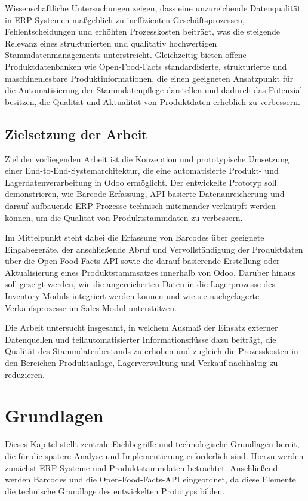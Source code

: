 \documentclass[12pt,a4paper]{article}
\begin{document}
Wissenschaftliche Untersuchungen zeigen, dass eine unzureichende Datenqualität in ERP-Systemen maßgeblich zu ineffizienten Geschäftsprozessen, Fehlentscheidungen und erhöhten Prozesskosten beiträgt, was die steigende Relevanz eines strukturierten und qualitativ hochwertigen Stammdatenmanagements unterstreicht. \autocite[Vgl.][]{gronau2017} Gleichzeitig bieten offene Produktdatenbanken wie Open-Food-Facts standardisierte, strukturierte und maschinenlesbare Produktinformationen, die einen geeigneten Ansatzpunkt für die Automatisierung der Stammdatenpflege darstellen und dadurch das Potenzial besitzen, die Qualität und Aktualität von Produktdaten erheblich zu verbessern. \autocite[Vgl.][]{gronau2017}

\subsection{Zielsetzung der Arbeit}

Ziel der vorliegenden Arbeit ist die Konzeption und prototypische Umsetzung einer End-to-End-Systemarchitektur, die eine automatisierte Produkt- und Lagerdatenverarbeitung in Odoo ermöglicht. Der entwickelte Prototyp soll demonstrieren, wie Barcode-Erfassung, API-basierte Datenanreicherung und darauf aufbauende ERP-Prozesse technisch miteinander verknüpft werden können, um die Qualität von Produktstammdaten zu verbessern.

Im Mittelpunkt steht dabei die Erfassung von Barcodes über geeignete Eingabegeräte, der anschließende Abruf und Vervollständigung der Produktdaten über die Open-Food-Facts-API sowie die darauf basierende Erstellung oder Aktualisierung eines Produktstammsatzes innerhalb von Odoo. Darüber hinaus soll gezeigt werden, wie die angereicherten Daten in die Lagerprozesse des Inventory-Moduls integriert werden können und wie sie nachgelagerte Verkaufsprozesse im Sales-Modul unterstützen.

Die Arbeit untersucht insgesamt, in welchem Ausmaß der Einsatz externer Datenquellen und teilautomatisierter Informationsflüsse dazu beiträgt, die Qualität des Stammdatenbestands zu erhöhen und zugleich die Prozesskosten in den Bereichen Produktanlage, Lagerverwaltung und Verkauf nachhaltig zu reduzieren.

\section{Grundlagen}

Dieses Kapitel stellt zentrale Fachbegriffe und technologische Grundlagen bereit, die für die spätere Analyse und Implementierung erforderlich sind. Hierzu werden zunächst ERP-Systeme und Produktstammdaten betrachtet. Anschließend werden Barcodes und die Open-Food-Facts-API eingeordnet, da diese Elemente die technische Grundlage des entwickelten Prototyps bilden.
\end{document}
